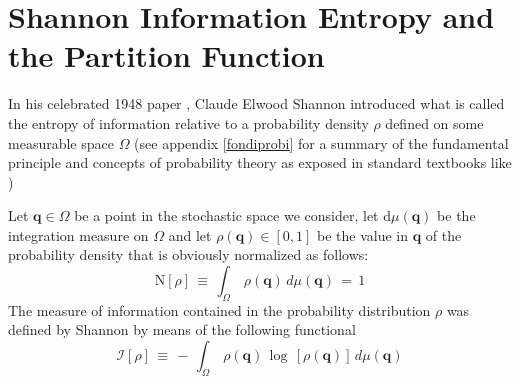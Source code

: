 \documentclass[10pt,a4paper]{article}
\begin{document}
\section{Shannon Information Entropy and the Partition Function}
\label{brillantone}
In his celebrated 1948 paper \cite{shannone}, Claude Elwood Shannon introduced what is called the entropy of information relative to a probability density $\rho$ defined on some measurable space $\Omega$ (see appendix \ref{fondiprobi} for
a summary of the fundamental principle and concepts of probability theory as exposed in standard textbooks like \cite{sinaikarolo})
\par
Let $\mathbf{q}\in \Omega$  be a point in the stochastic space we
consider, let $\mathrm{d}\mu(\mathbf{q})$ be the  integration measure on
$\Omega$ and let $\rho(\mathbf{q}) \in [0,1]$  be the value  in
$\mathbf{q}$ of the probability density  that is obviously normalized
as follows:
\begin{equation}\label{normaliz}
 \mathrm{N}[\rho] \,\equiv \,   \int_\Omega \, \rho(\mathbf{q}) \,d\mu(\mathbf{q}) \, = \, 1
\end{equation}
The measure of  information contained in the probability distribution
$\rho$ was  defined by Shannon by means of the following functional
\begin{equation}\label{shaninfo}
    \mathcal{I}\left[\rho\right] \, \equiv \, - \, \int_{\Omega}\,
    \rho(\mathbf{q}) \, \log \, \left[ \rho(\mathbf{q})\right] \,d\mu(\mathbf{q})
\end{equation}
\end{document}
